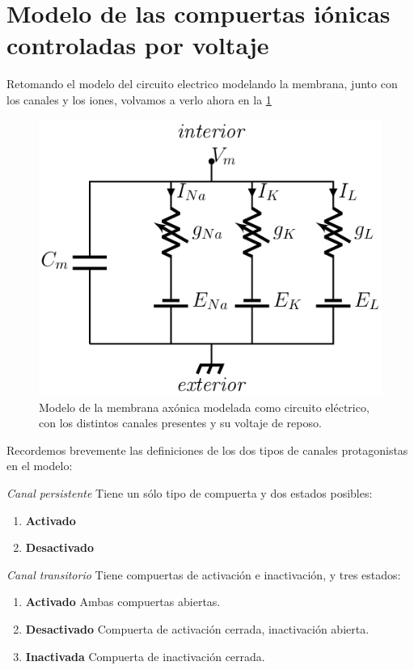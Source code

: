 \section{Modelo de las compuertas iónicas controladas por voltaje}

Retomando el modelo del circuito electrico modelando la membrana, junto con los canales y los iones, volvamos a verlo ahora en la \ref{fig:circuito1}

\begin{figure}[H]
 \centering
 \includegraphics[scale=0.5]{../Figuras/circuito.png}
 \caption{Modelo de la membrana axónica modelada como circuito eléctrico, con los distintos canales presentes y su voltaje de reposo.}
 \label{fig:circuito1}
\end{figure}

Recordemos brevemente las definiciones de los dos tipos de canales protagonistas en el modelo:

\begin{definition}
 \emph{Canal persistente} Tiene un sólo tipo de compuerta y dos estados posibles:
 \begin{enumerate}
  \item \textbf{Activado}
  \item \textbf{Desactivado}
 \end{enumerate}

\end{definition}

\begin{definition}
 \emph{Canal transitorio} Tiene compuertas de activación e inactivación, y tres estados:
 \begin{enumerate}
  \item \textbf{Activado} Ambas compuertas abiertas.
  \item \textbf{Desactivado} Compuerta de activación cerrada, inactivación abierta.
  \item \textbf{Inactivada} Compuerta de inactivación cerrada.
 \end{enumerate}

\end{definition}


